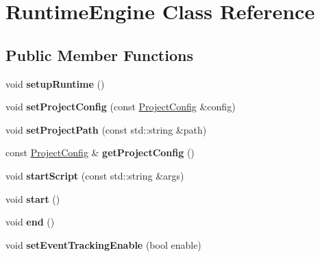 \hypertarget{classRuntimeEngine}{}\section{Runtime\+Engine Class Reference}
\label{classRuntimeEngine}
\subsection*{Public Member Functions}
\begin{DoxyCompactItemize}
\item 
\mbox{\label{classRuntimeEngine_a9f760c47b766e3d15f54cf27942cc6f7}} 
void {\bfseries setup\+Runtime} ()
\item 
\mbox{\label{classRuntimeEngine_a7f8f32c6c8dc7b52f372e9c7442fb344}} 
void {\bfseries set\+Project\+Config} (const \hyperlink{classProjectConfig}{Project\+Config} \&config)
\item 
\mbox{\label{classRuntimeEngine_ae81f687b8125fc9dcdb0b6d512c09753}} 
void {\bfseries set\+Project\+Path} (const std\+::string \&path)
\item 
\mbox{\label{classRuntimeEngine_a9d08862bf32666c99f7ede65e8c843eb}} 
const \hyperlink{classProjectConfig}{Project\+Config} \& {\bfseries get\+Project\+Config} ()
\item 
\mbox{\label{classRuntimeEngine_a1a95b4d480cc43fe5ba53e117d530ed2}} 
void {\bfseries start\+Script} (const std\+::string \&args)
\item 
\mbox{\label{classRuntimeEngine_afe862e9477f39cde1f15c8cfa66967c4}} 
void {\bfseries start} ()
\item 
\mbox{\label{classRuntimeEngine_a65425c578cef5e2280378f1bc99f9c75}} 
void {\bfseries end} ()
\item 
\mbox{\label{classRuntimeEngine_abad86af43e148e5aa9aa15ac18043569}} 
void {\bfseries set\+Event\+Tracking\+Enable} (bool enable)
\item 
\mbox{\label{classRuntimeEngine_a435d700bbfa07cedaa1796646b5bff98}} 

\end{DoxyCompactItemize}
